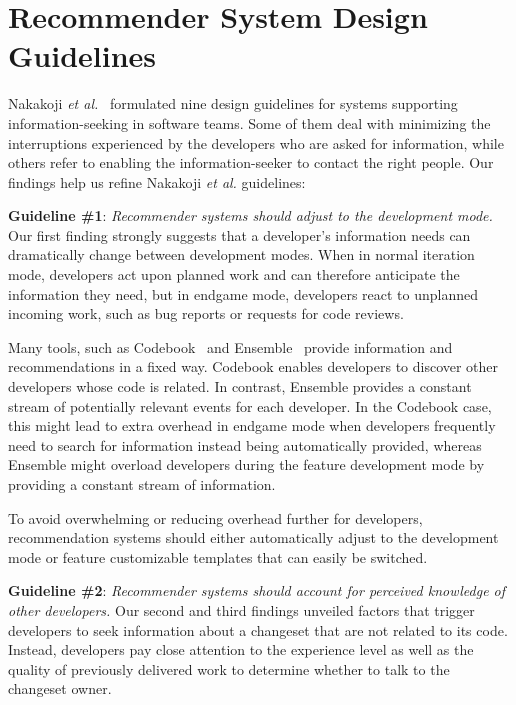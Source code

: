 \documentclass[12pt,oneside]{book}
\begin{document}
\section{Recommender System Design Guidelines}
\label{sec:sub:tools}
Nakakoji \emph{et al.}~\cite{nakakoji2010:rdc} formulated nine design guidelines for systems supporting information-seeking in software teams. Some of them deal with minimizing the interruptions experienced by the developers who are asked for information, while others refer to enabling the information-seeker to contact the right people. Our findings help us refine Nakakoji \emph{et al.} guidelines:


\textbf{Guideline \#1}: \emph{Recommender systems should adjust to the development mode.}
Our first finding strongly suggests that a developer's information needs can dramatically change between development modes. 
%
When in normal iteration mode, developers act upon planned work and can therefore anticipate the information they need, but in endgame mode, developers react to unplanned incoming work, such as bug reports or requests for code reviews. 

Many tools, such as Codebook~\cite{begel:icse:2010} and Ensemble~\cite{xiang:rsse:2008} provide information and recommendations in a fixed way. 
Codebook enables developers to discover other developers whose code is related.
In contrast,  Ensemble provides a constant stream of potentially relevant events for each developer.
In the Codebook case, this might lead to extra overhead in endgame mode when developers frequently need to search for information instead being automatically provided, whereas Ensemble might overload developers during the feature development mode by providing a constant stream of information.

To avoid overwhelming or reducing overhead further for developers, recommendation systems should either automatically adjust to the development mode or feature customizable templates that can easily be switched. 


\textbf{Guideline \#2}: \emph{Recommender systems should account for perceived knowledge of other developers.}
Our second and third findings unveiled factors that trigger developers to seek information about a changeset that are not related to its code. 
Instead, developers pay close attention to the experience level as well as the quality of previously delivered work to determine whether to talk to the changeset owner.
\end{document}
